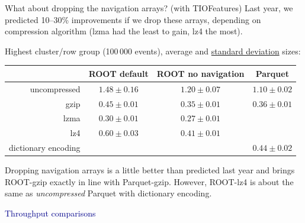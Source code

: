 \documentclass[aspectratio=169]{beamer}
\begin{document}
\begin{frame}{What about dropping the navigation arrays? (with TIOFeatures)}
\vspace{0.35 cm}
Last year, we predicted 10--30\% improvements if we drop these arrays, depending on compression algorithm (lzma had the least to gain, lz4 the most).

\vspace{0.25 cm}
Highest cluster/row group (100\,000 events), average and \underline{standard deviation} sizes:

\renewcommand{\arraystretch}{1.2}

\begin{center}
\begin{tabular}{r c c c}
                    & ROOT default    & ROOT no navigation & Parquet         \\\hline
uncompressed        & $1.48 \pm 0.16$ & $1.20 \pm 0.07$ & $1.10 \pm 0.02$ \\
gzip                & $0.45 \pm 0.01$ & $0.35 \pm 0.01$ & $0.36 \pm 0.01$ \\
lzma                & $0.30 \pm 0.01$ & $0.27 \pm 0.01$ &                 \\
lz4                 & $0.60 \pm 0.03$ & $0.41 \pm 0.01$ &                 \\
dictionary encoding &                 &                 & $0.44 \pm 0.02$ \\
\end{tabular}
\end{center}

\vspace{0.25 cm}
Dropping navigation arrays is a little better than predicted last year and brings ROOT-gzip exactly in line with Parquet-gzip. However, ROOT-lz4 is about the same as {\it uncompressed} Parquet with dictionary encoding.
\end{frame}

\begin{frame}{}
\vspace{0.5 cm}
\begin{center}
\Huge \textcolor{darkblue}{Throughput comparisons}
\end{center}
\end{frame}
\end{document}
